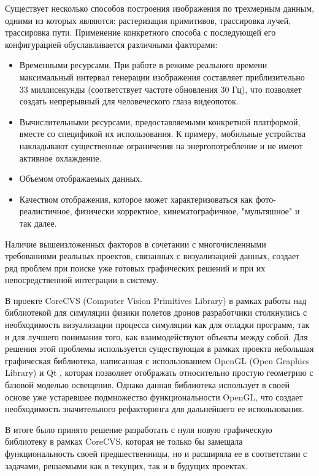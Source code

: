 \documentclass[14pt]{matmex-diploma}
\begin{document}
Существует несколько способов построения изображения по трехмерным данным, одними из которых являются: растеризация примитивов, трассировка лучей, трассировка пути. Применение конкретного способа с последующей его конфигурацией обуславливается различными факторами:

\begin{itemize}
    \item Временными ресурсами. При работе в режиме реального времени максимальный интервал генерации изображения составляет приблизительно 33 миллисекунды (соответствует частоте обновления 30 Гц), что позволяет создать непрерывный для человеческого глаза видеопоток.
    \item Вычислительными ресурсами, предоставляемыми конкретной платформой, вместе со спецификой их использования. К примеру, мобильные устройства накладывают существенные ограничения на энергопотребление и не имеют активное охлаждение.
    \item Объемом отображаемых данных.
    \item Качеством отображения, которое может характеризоваться как фото-реалистичное, физически корректное, кинематографичное, "мультяшное" \cite{wiki:celshading} и так далее. 
\end{itemize}

Наличие вышеизложенных факторов в сочетании с многочисленными требованиями реальных проектов, связанных с визуализацией данных, создает ряд проблем при поиске уже готовых графических решений и при их непосредственной интеграции в систему.       

В проекте CoreCVS \cite{github:corecvs} (Computer Vision Primitives Library) в рамках работы над библиотекой для симуляции физики полетов дронов разработчики столкнулись с необходимость визуализации процесса симуляции как для отладки программ, так и для лучшего понимания того, как взаимодействуют объекты между собой. Для решения этой проблемы используется существующая в рамках проекта небольшая графическая библиотека, написанная с использованием OpenGL \cite{spec:opengl} (Open Graphics Library) и Qt \cite{github:qt}, которая позволяет отображать относительно простую геометрию с базовой моделью освещения. Однако данная библиотека использует в своей основе уже устаревшее подмножество функциональности OpenGL, что создает необходимость значительного рефакторинга для дальнейшего ее использования.    

В итоге было принято решение разработать с нуля новую графическую библиотеку в рамках CoreCVS, которая не только бы замещала функциональность своей предшественницы, но и расширяла ее в соответствии с задачами, решаемыми как в текущих, так и в будущих проектах.
\end{document}

